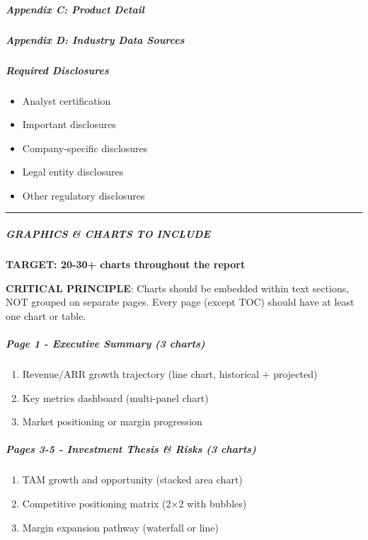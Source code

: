 \documentclass[11pt]{article}
\begin{document}
\subparagraph{Appendix C: Product Detail}\mbox{}\par
[Additional product information if needed]


\subparagraph{Appendix D: Industry Data Sources}\mbox{}\par
[List of sources used for industry analysis]


\subparagraph{Required Disclosures}\mbox{}\par
\begin{itemize}[leftmargin=*,itemsep=2pt,topsep=2pt]
\item {} Analyst certification
\item {} Important disclosures
\item {} Company-specific disclosures
\item {} Legal entity disclosures
\item {} Other regulatory disclosures
\end{itemize}

\vspace{0.5em}\hrule\vspace{0.5em}

\subparagraph{GRAPHICS \& CHARTS TO INCLUDE}\mbox{}\par

\textbf{TARGET: 20-30+ charts throughout the report}


\textbf{CRITICAL PRINCIPLE}: Charts should be embedded within text sections, NOT grouped on separate pages. Every page (except TOC) should have at least one chart or table.


\subparagraph{Page 1 - Executive Summary (3 charts)}\mbox{}\par
\begin{enumerate}[leftmargin=*,itemsep=2pt,topsep=2pt]
\item {} Revenue/ARR growth trajectory (line chart, historical + projected)
\item {} Key metrics dashboard (multi-panel chart)
\item {} Market positioning or margin progression
\end{enumerate}

\subparagraph{Pages 3-5 - Investment Thesis \& Risks (3 charts)}\mbox{}\par
\begin{enumerate}[leftmargin=*,itemsep=2pt,topsep=2pt]
\item {} TAM growth and opportunity (stacked area chart)
\item {} Competitive positioning matrix (2×2 with bubbles)
\item {} Margin expansion pathway (waterfall or line)
\end{enumerate}
\end{document}
